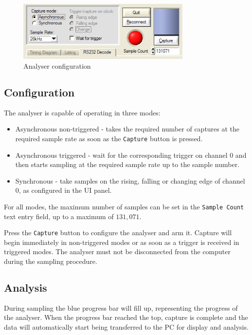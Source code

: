 \documentclass[11pt,twocolumn]{article}
\begin{document}
    \begin{figure}
    \centering
    \includegraphics[height=3cm]{ui-config}
    \caption{Analyser configuration}
    \label{fig:ui-config}
    \end{figure}

\subsection{Configuration}
   The analyser is capable of operating in three modes: 
   \begin{itemize}
        \item Asynchronous non-triggered - takes the required number of
            captures at the required sample rate as soon as the
            \texttt{Capture} button is pressed.
        \item Asynchronous triggered - wait for the corresponding trigger on
            channel 0 and then starts sampling at the required sample rate up
            to the sample number.
        \item Synchronous - take samples on the rising, falling or changing
            edge of channel 0, as configured in the UI panel.
    \end{itemize}

    For all modes, the maximum number of samples can be set in the
    \texttt{Sample Count} text entry field, up to a maximum of $131,071$.

    Press the \texttt{Capture} button to configure the analyser and arm it.
    Capture will begin immediately in non-triggered modes or as soon as a
    trigger is received in triggered modes. The analyser must not be
    disconnected from the computer during the sampling procedure.

\subsection{Analysis}
    During sampling the blue progress bar will fill up, representing the
    progress of the analyser. When the progress bar reached the top, capture is
    complete and the data will automatically start being transferred to the PC
    for display and analysis.
\end{document}
